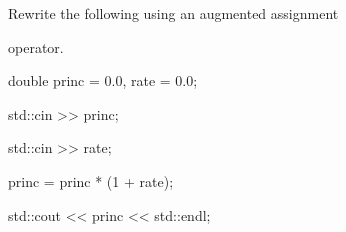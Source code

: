 
Rewrite the following using an augmented assignment

operator.

\begin{console}

double princ = 0.0, rate = 0.0;

std::cin >> princ;

std::cin >> rate;

princ = princ * (1 + rate);

std::cout << princ << std::endl;

\end{console}

